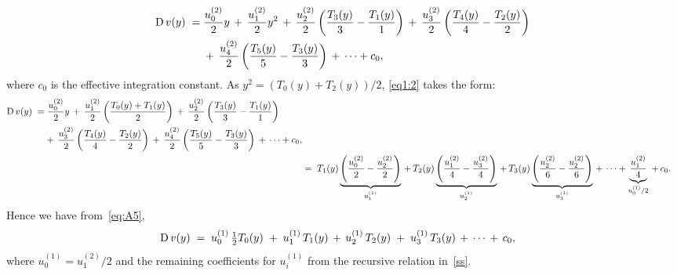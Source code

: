 \documentclass[%
secnumarabic,%
 amssymb, amsmath,%
 aps,prf,superscriptaddress,longbibliography
frontmatterverbose,
]{revtex4-2}
\begin{document}
\begin{align}\label{eq1:2}
  \begin{split}
    \mathrm D\,v(y) \;=&\; \frac{u^{(2)}_0}{2}y \,+ \, \frac{u^{(2)}_1}{2}y^2 \,+\,\frac{u^{(2)}_2}{2}\left(\frac{T_3(y)}{3} - \frac{T_1(y)}{1}\right) \,+\,\frac{u^{(2)}_3}{2}\left(\frac{T_4(y)}{4} - \frac{T_2(y)}{2}\right)\,\\
    &\;+\,\frac{u^{(2)}_4}{2}\left(\frac{T_5(y)}{5} - \frac{T_3(y)}{3}\right)\,+\, \cdots + c_0,
  \end{split}
\end{align}
where $c_0$ is the effective integration constant.
As $y^2 = (T_0(y)+T_2(y))/2$, \eqref{eq1:2} takes the form:
\begin{align}
  \begin{split}
  \mathrm D\,v(y)\;=&\; \frac{u^{(2)}_0}{2}y \,+\, \frac{u^{(2)}_1}{2} \left(\frac{T_0(y) + T_1(y)}{2}\right) \,+\,\frac{u^{(2)}_2}{2}\left(\frac{T_3(y)}{3} - \frac{T_1(y)}{1}\right) \,\\&+\,\frac{u^{(2)}_3}{2}\left(\frac{T_4(y)}{4} - \frac{T_2(y)}{2}\right)\,+\,\frac{u^{(2)}_4}{2}\left(\frac{T_5(y)}{5} - \frac{T_3(y)}{3}\right)\,+\, \cdots + c_0,
\end{split} \\
  &=\; T_1(y)\underbrace{\left(\frac{u^{(2)}_0}{2} - \frac{u^{(2)}_2}{2}\right)}_{u^{(1)}_1} \,+\,T_2(y)\underbrace{\left(\frac{u^{(2)}_1}{4} - \frac{u^{(2)}_3}{4} \right)}_{u^{(1)}_2} \,+\,T_3(y)\underbrace{\left(\frac{u^{(2)}_2}{6} - \frac{u^{(2)}_2}{6}\right)}_{u^{(1)}_3} \,+\,\cdots + \underbrace{\frac{u^{(2)}_1}{4}}_{u^{(1)}_0/2} \,+\, c_0.\label{eq:A5}
\end{align}
Hence we have from~\eqref{eq:A5},
\begin{align}
  \mathrm D\, v(y) \;&=\; u^{(1)}_0 \,\tfrac{1}{2}T_0(y) \;+\; u^{(1)}_1\,T_1(y) \,+\, u^{(1)}_2\,T_2(y) \;+\; u^{(1)}_3\,T_3(y) \,+\, \cdots \,+\, c_0,
\end{align}
where $u^{(1)}_0 = u^{(2)}_1/2$ and the remaining coefficients for $u^{(1)}_i$ from the recursive relation in~\eqref{ss}.
\newpage\noindent


\singlespacing

\end{document}
